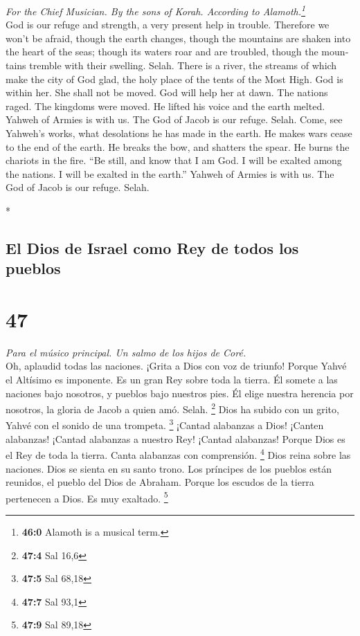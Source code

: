 \begin{paracol}{2}
\begin{otherlanguage}{english}
\emph{For the Chief Musician. By the sons of Korah. According to
Alamoth.\footnote{\textbf{46:0} Alamoth is a musical term.}}\\
 God is our refuge and strength, a very present help in
trouble.  Therefore we won't be afraid, though the earth
changes, though the mountains are shaken into the heart of the seas;
 though its waters roar and are troubled, though the
mountains tremble with their swelling. Selah.  There is a
river, the streams of which make the city of God glad, the holy place of
the tents of the Most High.  God is within her. She shall
not be moved. God will help her at dawn.  The nations
raged. The kingdoms were moved. He lifted his voice and the earth
melted.  Yahweh of Armies is with us. The God of Jacob is
our refuge. Selah.  Come, see Yahweh's works, what
desolations he has made in the earth.  He makes wars cease
to the end of the earth. He breaks the bow, and shatters the spear. He
burns the chariots in the fire.  ``Be still, and know
that I am God. I will be exalted among the nations. I will be exalted in
the earth.''  Yahweh of Armies is with us. The God of
Jacob is our refuge. Selah.

\end{otherlanguage}

\switchcolumn[0]*

\hypertarget{el-dios-de-israel-como-rey-de-todos-los-pueblos}{%
\subsection{El Dios de Israel como Rey de todos los
pueblos}\label{el-dios-de-israel-como-rey-de-todos-los-pueblos}}

\hypertarget{section-92}{%
\section{47}\label{section-92}}

\emph{Para el músico principal. Un salmo de los hijos de Coré.}\\
 Oh, aplaudid todas las naciones. ¡Grita a Dios con voz de
triunfo!  Porque Yahvé el Altísimo es imponente. Es un
gran Rey sobre toda la tierra.  Él somete a las naciones
bajo nosotros, y pueblos bajo nuestros pies.  Él elige
nuestra herencia por nosotros, la gloria de Jacob a quien amó. Selah.
\footnote{\textbf{47:4} Sal 16,6}  Dios ha subido con un
grito, Yahvé con el sonido de una trompeta. \footnote{\textbf{47:5} Sal
  68,18}  ¡Cantad alabanzas a Dios! ¡Canten alabanzas!
¡Cantad alabanzas a nuestro Rey! ¡Cantad alabanzas! 
Porque Dios es el Rey de toda la tierra. Canta alabanzas con
comprensión. \footnote{\textbf{47:7} Sal 93,1}  Dios reina
sobre las naciones. Dios se sienta en su santo trono.  Los
príncipes de los pueblos están reunidos, el pueblo del Dios de Abraham.
Porque los escudos de la tierra pertenecen a Dios. Es muy exaltado.
\footnote{\textbf{47:9} Sal 89,18}


\end{paracol}
